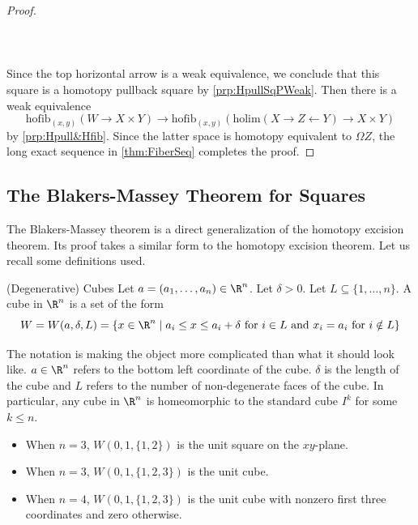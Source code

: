 \documentclass[a4paper]{article}
\begin{document}
\begin{prp}{}{}
\begin{proof}
\\~\\  \\~\\
Since the top horizontal arrow is a weak equivalence, we conclude that this square is a homotopy pullback square by \ref{prp:HpullSqPWeak}. Then there is a weak equivalence $$\text{hofib}_{(x,y)}(W\to X\times Y)\to\text{hofib}_{(x,y)}(\text{holim}(X\rightarrow Z\leftarrow Y)\to X\times Y)$$ by \ref{prp:Hpull&Hfib}. Since the latter space is homotopy equivalent to $\Omega Z$, the long exact sequence in \ref{thm:FiberSeq} completes the proof. 
\end{proof}
\end{prp}

\subsection{The Blakers-Massey Theorem for Squares}
The Blakers-Massey theorem is a direct generalization of the homotopy excision theorem. Its proof takes a similar form to the homotopy excision theorem. Let us recall some definitions used. 

\begin{defn}{(Degenerative) Cubes}{} Let $a=(a_1,\dots,a_n)\in\R^n$. Let $\delta>0$. Let $L\subseteq\{1,\dots,n\}$. A cube in $\R^n$ is a set of the form $$W=W(a,\delta,L)=\{x\in\R^n\;|\;a_i\leq x\leq a_i+\delta\text{ for }i\in L\text{ and }x_i=a_i\text{ for }i\notin L\}$$
\end{defn}

The notation is making the object more complicated than what it should look like. $a\in\R^n$ refers to the bottom left coordinate of the cube. $\delta$ is the length of the cube and $L$ refers to the number of non-degenerate faces of the cube. In particular, any cube in $\R^n$ is homeomorphic to the standard cube $I^k$ for some $k\leq n$. 
\begin{itemize}
\item When $n=3$, $W(0,1,\{1,2\})$ is the unit square on the $xy$-plane. 
\item When $n=3$, $W(0,1,\{1,2,3\})$ is the unit cube. 
\item When $n=4$, $W(0,1,\{1,2,3\})$ is the unit cube with nonzero first three coordinates and zero otherwise. 
\end{itemize}
\end{document}
